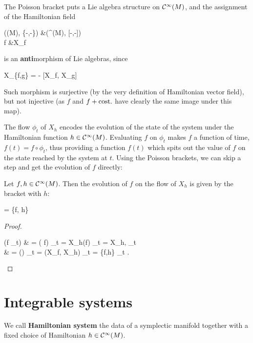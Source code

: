\documentclass[main.tex]{subfiles}
\begin{document}
\begin{corollary}
	The Poisson bracket puts a Lie algebra structure on $\mathcal{C}^\infty(M)$, and the assignment of the Hamiltonian field
	\begin{eqalign}
		(\Cinfty(M), \{-,-\}) &\longto (\fields^{}(M), [-,-])\\
		f &\longmapsto X_f
	\end{eqalign}
	is an \textbf{anti}morphism of Lie algebras, since
	\begin{eqalign}
		X_{\{f,g\}} = - [X_f, X_g]
	\end{eqalign}
	Such morphism is surjective (by the very definition of Hamiltonian vector field), but not injective (as $f$ and $f+\text{cost.}$ have clearly the same image under this map).
\end{corollary}

The flow $\phi_t$ of $X_h$ encodes the evolution of the state of the system under the Hamiltonian function $h \in \mathcal{C}^\infty(M)$. Evaluating $f$ on $\phi_t$ makes $f$ a function of time, $f(t) = f \circ \phi_t$, thus providing a function $f(t)$ which spits out the value of $f$ on the state reached by the system at $t$. Using the Poisson brackets, we can skip a step and get the evolution of $f$ directly:

\begin{theorem}
	Let $f, h \in \mathcal{C}^\infty(M)$. Then the evolution of $f$ on the flow of $X_h$ is given by the bracket with $h$:
	\begin{eqalign}
		 = \{f, h\}
	\end{eqalign}
\end{theorem}
\begin{proof}
	\begin{eqalign}
		 (f \circ \phi_t) & = ( f) \circ \phi_t = X_h(f) \circ \phi_t = \langle X_h, \omega \rangle \circ \phi_t\\
		& = (\omega) \circ \phi_t = \omega(X_f, X_h) \circ \phi_t = \{f,h\} \circ \phi_t .
	\end{eqalign}
\end{proof}

\chapter{Integrable systems}
\begin{definition}
	We call \textbf{Hamiltonian system} the data of a symplectic manifold together with a fixed choice of Hamiltonian $h \in \mathcal{C}^\infty(M)$.
\end{definition}
\end{document}
